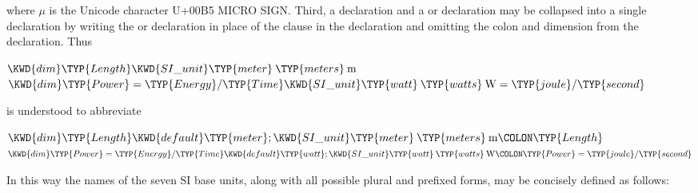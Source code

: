 where $\mu$ is the Unicode character U+00B5 MICRO SIGN.
Third, a  declaration and a  or
 declaration
may be collapsed into a single declaration by writing the 
or 
declaration in place of the  clause in the  declaration
and omitting the colon and dimension from the  declaration.
Thus
\begin{Fortress}
\(\KWD{dim} \TYP{Length}  \KWD{SI{\char'137}unit} \TYP{meter}\mskip 4mu plus 4mu\TYP{meters}\mskip 4mu plus 4mu\mathrm{m}\)\\
\(\KWD{dim} \TYP{Power} = \TYP{Energy}/\TYP{Time}  \KWD{SI{\char'137}unit} \TYP{watt}\mskip 4mu plus 4mu\TYP{watts}\mskip 4mu plus 4mu\mathrm{W} = \TYP{joule}/\TYP{second}\)
\end{Fortress}
is understood to abbreviate
\begin{Fortress}
\(\KWD{dim} \TYP{Length} \KWD{default} \TYP{meter}; \KWD{SI{\char'137}unit} \TYP{meter}\mskip 4mu plus 4mu\TYP{meters}\mskip 4mu plus 4mu\mathrm{m}\COLON \TYP{Length}\)\\
\(\KWD{dim} \TYP{Power} = \TYP{Energy}/\TYP{Time} \KWD{default} \TYP{watt}; \KWD{SI{\char'137}unit} \TYP{watt}\mskip 4mu plus 4mu\TYP{watts}\mskip 4mu plus 4mu\mathrm{W}\COLON \TYP{Power} = \TYP{joule}/\TYP{second}\)
\end{Fortress}
In this way the names of the seven SI base units, along with all
possible plural and prefixed forms, may be concisely defined as follows:

